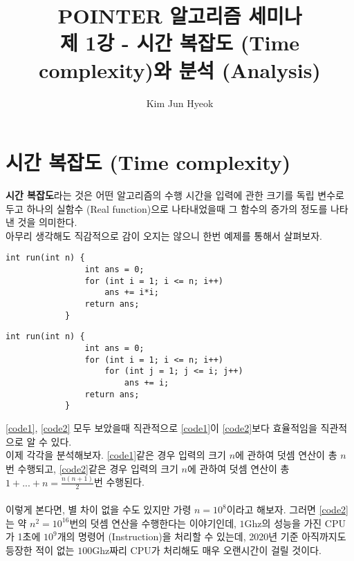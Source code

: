 \documentclass{article}
\begin{document}
    \title{%
        POINTER 알고리즘 세미나 \\
        \large 제 1강 - 시간 복잡도 (Time complexity)와 분석 (Analysis)}
    \author{Kim Jun Hyeok}
    \maketitle
    \section{시간 복잡도 (Time complexity)}
        \linespread{1.25}
        \textbf{시간 복잡도}라는 것은 어떤 알고리즘의 수행 시간을 입력에 관한 크기를 독립 변수로 두고 하나의 실함수 (Real function)으로 나타내었을때 그 함수의 증가의 정도를 나타낸 것을 의미한다. \\
        아무리 생각해도 직감적으로 감이 오지는 않으니 한번 예제를 통해서 살펴보자.
        \begin{lstlisting}[label=code1,caption={$1^{2} + ... + n^{2}$을 반환하는 코드이고 시간복잡도는 $O(a)$이다.}]
            int run(int n) {
                int ans = 0;
                for (int i = 1; i <= n; i++)
                    ans += i*i;
                return ans;
            }
        \end{lstlisting}
        \begin{lstlisting}[label=code2,caption={$1^{2} + ... + n^{2}$을 반환하는 코드이고 시간복잡도는 $O(a^{2})$이다.}]
            int run(int n) {
                int ans = 0;
                for (int i = 1; i <= n; i++)
                    for (int j = 1; j <= i; j++)
                        ans += i;
                return ans;
            }
        \end{lstlisting}
        \ref{code1}, \ref{code2} 모두 보았을때 직관적으로 \ref{code1}이 \ref{code2}보다 효율적임을 직관적으로 알 수 있다. \\
        이제 각각을 분석해보자. \ref{code1}같은 경우 입력의 크기 $n$에 관하여 덧셈 연산이 총 $n$번 수행되고, \ref{code2}같은 경우 입력의 크기 $n$에 관하여 덧셈 연산이 총 $1 + ... + n = \frac{n(n+1)}{2}$번 수행된다. \\ \\

        이렇게 본다면, 별 차이 없을 수도 있지만 가령 $n=10^8$이라고 해보자. 
        그러면 \ref{code2}는 약 $n^{2}=10^{16}$번의 덧셈 연산을 수행한다는 이야기인데, $1$Ghz의 성능을 가진 CPU가 1초에 $10^9$개의 명령어 (Instruction)을 처리할 수 있는데, 2020년 기준 아직까지도 등장한 적이 없는 $100$Ghz짜리 CPU가 처리해도 매우 오랜시간이 걸릴 것이다. \\ \\
\end{document}
